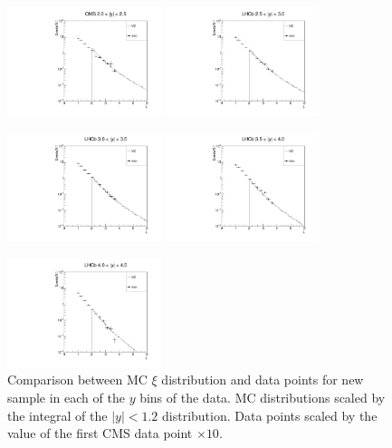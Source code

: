 \documentclass{article}
\begin{document}
\clearpage


\begin{figure}[h!]
\centering
\includegraphics[width = 0.4\textwidth]{plots/xi_new_LHCb_y0.pdf}
\includegraphics[width = 0.4\textwidth]{plots/xi_new_LHCb_y1.pdf}

\includegraphics[width = 0.4\textwidth]{plots/xi_new_LHCb_y2.pdf}
\includegraphics[width = 0.4\textwidth]{plots/xi_new_LHCb_y3.pdf}

\includegraphics[width = 0.4\textwidth]{plots/xi_new_LHCb_y4.pdf}
\caption{Comparison between MC $\xi$ distribution and data points for new sample in each of the $y$ bins of the data. MC distributions scaled by the integral of the $|y|<1.2$ distribution. Data points scaled by the value of the first CMS data point $\times 10$.}\label{f:xi_comp_new}
\end{figure}
\end{document}
